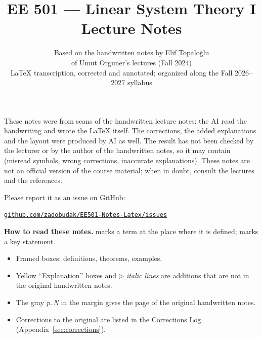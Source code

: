
\title{\textbf{EE 501 --- Linear System Theory I}\\[0.4em]\large Lecture Notes}
\author{Based on the handwritten notes by Elif Topalo\u{g}lu\\
of Umut Orguner's lectures (Fall 2024)\\[0.6em]
\small \LaTeX{} transcription, corrected and annotated; organized along the Fall 2026--2027 syllabus}
\date{}
\maketitle

\begin{center}
\begin{minipage}{0.85\linewidth}
\begin{tcolorbox}[colback=red!3,colframe=red!55!black,boxrule=0.6pt,arc=2pt,left=6pt,right=6pt,top=4pt,bottom=4pt,
  fonttitle=\small\bfseries,title={Please note}]
\small
These notes were  from scans of the handwritten lecture notes: the AI read the
handwriting and wrote the \LaTeX{} itself. The corrections, the added explanations and the layout were produced by AI as well.
The result has not been checked by the lecturer or by the author of the handwritten notes, so it may contain
 (misread symbols, wrong corrections, inaccurate explanations).
These notes are not an official version of the course material; when in doubt, consult the lectures and the references.

\par\smallskip
{\raggedright{} Please report it as an issue on GitHub:\par
\centering\href{https://github.com/zadobudak/EE501-Notes-Latex/issues}{\texttt{github.com/zadobudak/EE501-Notes-Latex/issues}}\par}
\end{tcolorbox}
\end{minipage}
\end{center}

\begin{center}
\begin{minipage}{0.85\linewidth}
\small
\textbf{How to read these notes.}
 marks a term at the place where it is defined;  marks a key statement.
\begin{itemize}[nosep]
\item Framed boxes: \textcolor{blue!55!black}{definitions}, \textcolor{red!55!black}{theorems}, \textcolor{green!45!black}{examples}.
\item \textcolor{orange!60!black}{Yellow ``Explanation'' boxes} and \textit{$\triangleright$ italic lines} are additions that are not in the original handwritten notes.
\item The gray \textit{p.\,N} in the margin gives the page of the original handwritten notes.
\item Corrections to the original are listed in the Corrections Log (Appendix~\ref{sec:corrections}).
\end{itemize}
\end{minipage}
\end{center}

